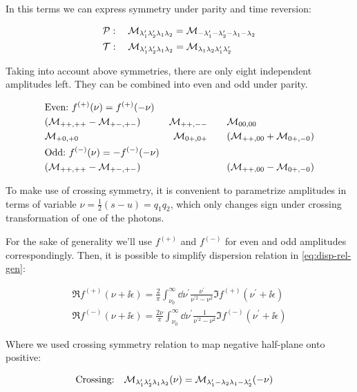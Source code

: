 In this terms we can express symmetry under parity and time reversion:

\begin{align}
    & \mathcal{P}:\quad \mathcal{M}_{\lambda_1^\prime \lambda_2^\prime \lambda_1 \lambda_2} = \mathcal{M}_{-\lambda_1^\prime -\lambda_2^\prime -\lambda_1 -\lambda_2} \\
    & \mathcal{T}:\quad \mathcal{M}_{\lambda_1^\prime \lambda_2^\prime \lambda_1 \lambda_2} = \mathcal{M}_{\lambda_1 \lambda_2 \lambda_1^\prime \lambda_2^\prime}
\end{align}

Taking into account above symmetries, there are only eight independent amplitudes left. They can be combined into even and odd under parity.

\begin{align}
    &\text{Even:}~f^{(+)}(\nu) = f^{(+)}(-\nu) && \\ \nonumber
    &(\mathcal{M}_{++,++}-\mathcal{M}_{+-,+-}) &\mathcal{M}_{++,--}\qquad &\mathcal{M}_{00,00}\\
    &\mathcal{M}_{+0,+0} &\mathcal{M}_{0+,0+}\qquad &(\mathcal{M}_{++,00} + \mathcal{M}_{0+,-0})\\
    &\text{Odd:}~f^{(-)}(\nu) = -f^{(-)}(-\nu) && \\ \nonumber
    &(\mathcal{M}_{++,++} - \mathcal{M}_{+-,+-}) & &(\mathcal{M}_{++,00} - \mathcal{M}_{0+,-0})
\end{align}

To make use of crossing symmetry, it is convenient to parametrize amplitudes in terms of variable $\nu = \frac{1}{2} (s - u) = q_1 q_2$, which only changes sign under crossing transformation of one of the photons.

For the sake of generality we'll use $f^{(+)}$ and $f^{(-)}$ for even and odd amplitudes correspondingly. Then, it is possible to simplify dispersion relation in \cref{eq:disp-rel-gen}:

\begin{align}
    \Re f^{(+)}(\nu + \ii \epsilon) = \frac{2}{\pi} \int_{\nu_0}^{\infty} \dd{\nu^\prime} \frac{\nu^\prime}{\nu^{\prime 2} - \nu^2} \Im f^{(+)}(\nu^\prime + \ii \epsilon) \\
    \Re f^{(-)}(\nu + \ii \epsilon) = \frac{2\nu}{\pi} \int_{\nu_0}^{\infty} \dd{\nu^\prime} \frac{1}{\nu^{\prime 2} - \nu^2} \Im f^{(-)}(\nu^\prime + \ii \epsilon)
\end{align}

Where we used crossing symmetry relation to map negative half-plane onto positive:

\begin{align}
    & \text{Crossing:}\quad \mathcal{M}_{\lambda_1^\prime \lambda_2^\prime \lambda_1 \lambda_2}(\nu) = \mathcal{M}_{\lambda_1^\prime -\lambda_2 \lambda_1 -\lambda_2^\prime}(-\nu)
\end{align}


